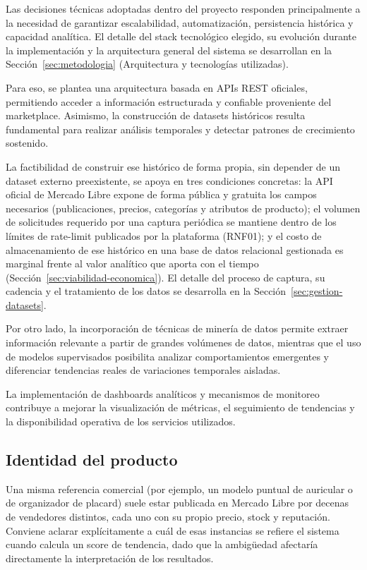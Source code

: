 Las decisiones técnicas adoptadas dentro del proyecto responden principalmente a la necesidad de garantizar escalabilidad, automatización, persistencia histórica y capacidad analítica. El detalle del stack tecnológico elegido, su evolución durante la implementación y la arquitectura general del sistema se desarrollan en la Sección~\ref{sec:metodologia} (Arquitectura y tecnologías utilizadas).

Para eso, se plantea una arquitectura basada en APIs REST oficiales, permitiendo acceder a información estructurada y confiable proveniente del marketplace. Asimismo, la construcción de datasets históricos resulta fundamental para realizar análisis temporales y detectar patrones de crecimiento sostenido.

La factibilidad de construir ese histórico de forma propia, sin depender de un dataset externo preexistente, se apoya en tres condiciones concretas: la API oficial de Mercado Libre expone de forma pública y gratuita los campos necesarios (publicaciones, precios, categorías y atributos de producto); el volumen de solicitudes requerido por una captura periódica se mantiene dentro de los límites de rate-limit publicados por la plataforma (RNF01); y el costo de almacenamiento de ese histórico en una base de datos relacional gestionada es marginal frente al valor analítico que aporta con el tiempo (Sección~\ref{sec:viabilidad-economica}). El detalle del proceso de captura, su cadencia y el tratamiento de los datos se desarrolla en la Sección~\ref{sec:gestion-datasets}.

Por otro lado, la incorporación de técnicas de minería de datos permite extraer información relevante a partir de grandes volúmenes de datos, mientras que el uso de modelos supervisados posibilita analizar comportamientos emergentes y diferenciar tendencias reales de variaciones temporales aisladas.

La implementación de dashboards analíticos y mecanismos de monitoreo contribuye a mejorar la visualización de métricas, el seguimiento de tendencias y la disponibilidad operativa de los servicios utilizados.

\subsection{Identidad del producto}\label{sec:identidad-producto}

Una misma referencia comercial (por ejemplo, un modelo puntual de auricular o de organizador de placard) suele estar publicada en Mercado Libre por decenas de vendedores distintos, cada uno con su propio precio, stock y reputación. Conviene aclarar explícitamente a cuál de esas instancias se refiere el sistema cuando calcula un score de tendencia, dado que la ambigüedad afectaría directamente la interpretación de los resultados.

